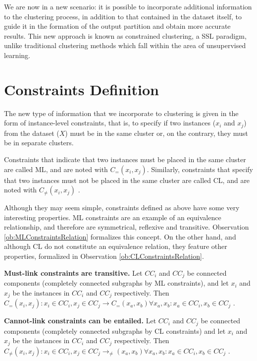 We are now in a new scenario: it is possible to incorporate additional information to the clustering process, in addition to that contained in the dataset itself, to guide it in the formation of the output partition and obtain more accurate results. This new approach is known as constrained clustering, a \acf{SSL} paradigm, unlike traditional clustering methods which fall within the area of unsupervised learning. 

\section{Constraints Definition} \label{sec:ConstDef}

The new type of information that we incorporate to clustering is given in the form of instance-level constraints, that is, to specify if two instances ($x_i$ and $x_j$) from the dataset ($X$) must be in the same cluster or, on the contrary, they must be in separate clusters.

Constraints that indicate that two instances must be placed in the same cluster are called \acf{ML}, and are noted with $C_=(x_i,x_j)$. Similarly, constraints that specify that two instances must not be placed in the same cluster are called \acf{CL}, and are noted with $C_{\neq}(x_i,x_j)$ \cite{wagstaff2000clustering}.

Although they may seem simple, constraints defined as above have some very interesting properties. \acs{ML} constraints are an example of an equivalence relationship, and therefore are symmetrical, reflexive and transitive. Observation \ref{ob:MLConstraintsRelation} formalizes this concept. On the other hand, and although \acs{CL} do not constitute an equivalence relation, they feature other properties, formalized in Observation \ref{ob:CLConstraintsRelation}.

\begin{observation}
	\textbf{Must-link constraints are transitive.} Let $CC_i$ and $CC_j$ be connected components (completely connected subgraphs by \acs{ML} constraints), and let $x_i$ and $x_j$ be the instances in $CC_i$ and $CC_j$ respectively. Then $C_=(x_i,x_j): x_i \in CC_i, x_j \in CC_j \rightarrow C_=(x_a,x_b) \forall x_a, x_b: x_a\in CC_i, x_b \in CC_j$ \cite{davidson2007survey}.
	\label{ob:MLConstraintsRelation}
\end{observation}

\begin{observation}
	\textbf{Cannot-link constraints can be entailed.} Let $CC_i$ and $CC_j$ be connected components (completely connected subgraphs by \acs{CL} constraints) and let $x_i$ and $x_j$ be the instances in $CC_i$ and $CC_j$ respectively. Then $C_{\neq}(x_i, x_j): x_i \in CC_i, x_j \in CC_j \rightarrow _{\neq}(x_a, x_b) \forall x_a, x_b: x_a\in CC_i, x_b \in CC_j$ \cite{davidson2007survey}
	\label{ob:CLConstraintsRelation}.
\end{observation}

